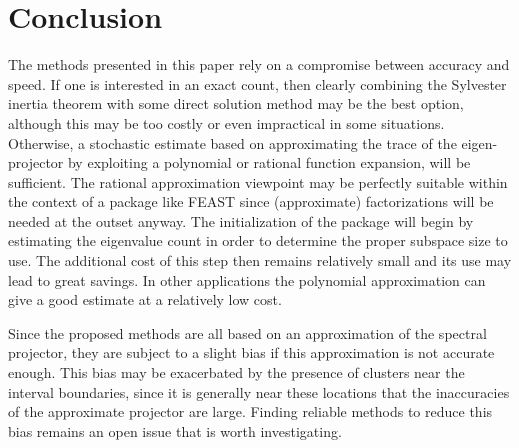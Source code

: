 \documentclass[12pt]{article}		\usepackage{tabls,multirow}
\begin{document}
\section{Conclusion}\label{sec:concl} 
The methods  presented in this paper rely on a compromise
between accuracy and speed. If one is interested in an exact
count, then clearly combining  the Sylvester inertia theorem
with some direct solution method may be the best option, although
this may be too costly or even impractical in some situations.
Otherwise, a stochastic estimate based on approximating the trace
of the eigen-projector by exploiting a polynomial or rational function
expansion, will be sufficient.
The rational approximation viewpoint may be perfectly suitable 
within the context  of a package like FEAST since 
(approximate) factorizations will be needed at the outset anyway.
The initialization of the package will begin by estimating
the eigenvalue count in order to determine the proper subspace 
size  to use. The additional cost of this step then remains
relatively small and its use may lead to great savings.
In other applications the polynomial approximation can give
a good estimate at a relatively low cost.

Since the  proposed methods are all  based on an  approximation of the
spectral  projector,  they  are  subject  to a  slight  bias  if  this
approximation is not accurate enough.  This bias may be exacerbated by
the presence of clusters near  the interval boundaries, since it is
generally near these locations that the inaccuracies of the 
approximate projector are large. 
Finding reliable methods to reduce this bias 
remains an open issue that is worth investigating.




\end{document}
